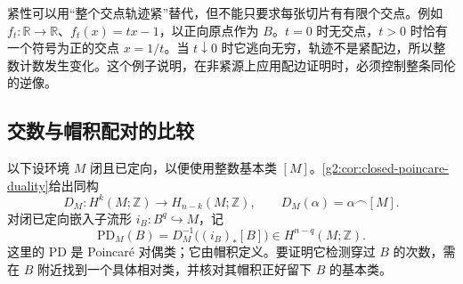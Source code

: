 \ProseParagraphBreak

紧性可以用“整个交点轨迹紧”替代，但不能只要求每张切片有有限个交点。例如 \(f_t:\mathbb R\to\mathbb R\)、\(f_t(x)=tx-1\)，以正向原点作为 \(B\)。\(t=0\) 时无交点，\(t>0\) 时恰有一个符号为正的交点 \(x=1/t\)。当 \(t\downarrow0\) 时它逃向无穷，轨迹不是紧配边，所以整数计数发生变化。这个例子说明，在非紧源上应用配边证明时，必须控制整条同伦的逆像。

\subsection{交数与帽积配对的比较}
\label{g2:subsec:1602:04}

以下设环境 \(M\) 闭且已定向，以便使用整数基本类 \([M]\)。\cref{g2:cor:closed-poincare-duality}给出同构
\[
	D_M:H^k(M;\mathbb Z)\longrightarrow H_{n-k}(M;\mathbb Z),\qquad
	D_M(\alpha)=\alpha\frown[M].
\]
对闭已定向嵌入子流形 \(i_B:B^q\hookrightarrow M\)，记
\[
	\mathrm{PD}_M(B)=D_M^{-1}\bigl((i_B)_*[B]\bigr)\in H^{n-q}(M;\mathbb Z).
\]
这里的 \(\mathrm{PD}\) 是 Poincaré 对偶类；它由帽积定义。要证明它检测穿过 \(B\) 的次数，需在 \(B\) 附近找到一个具体相对类，并核对其帽积正好留下 \(B\) 的基本类。

